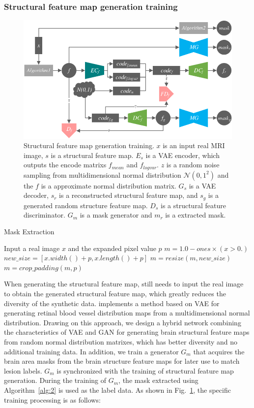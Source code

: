 \documentclass[runningheads]{llncs}
\begin{document}
\subsubsection{Structural feature map generation training}
\begin{figure}
	\centering
	\includegraphics[width=0.98\columnwidth]{figures/feature_train}
	\caption{Structural feature map generation training. $x$ is an input real MRI image, $s$ is a structural feature map. $E_s$ is a VAE encoder, which outputs the encode matrixs $f_{mean}$ and $f_{logvar}$. $z$ is a random noise sampling from multidimensional normal distribution $\mathcal{N}(0,1^2)$ and the $f$ is a approximate normal distribution matrix. $G_s$ is a VAE decoder, $s_r$ is a reconstructed structural feature map, and $s_g$ is a generated random structure feature map. $D_{s}$ is a structural feature discriminator. $G_m$ is a mask generator and $m_r$ is a extracted mask. }
	\label{feature_train}
\end{figure}
\begin{algorithm}
	\caption{Mask Extraction}
	\label{alg:2}
	\begin{algorithmic}[1]
		\State Input a real image $x$ and the expanded pixel value $p$
		\State $m = 1.0 - ones \times (x > 0.)$
		\State $new\_size=[x.width() + p, x.length() + p]$
		\State $m = resize(m, new\_size)$
		\State $m = crop\_padding(m,p)$
	\end{algorithmic}  
\end{algorithm}
When generating the structural feature map, \cite{4shin2018medical} still needs to input the real image to obtain the generated structural feature map, which greatly reduces the diversity of the synthetic data. \cite{41costa2017towards} implements a method based on VAE for generating retinal blood vessel distribution maps from a multidimensional normal distribution. Drawing on this approach, we design a hybrid network combining the characteristics of VAE and GAN for generating brain structural feature maps from random normal distribution matrixes, which has better diversity and no additional training data. In addition, we train a generator $G_m$ that acquires the brain area masks from the brain structure feature maps for later use to match lesion labels. $G_m$ is synchronized with the training of structural feature map generation. During the training of $G_m$, the mask extracted using Algorithm~\ref{alg:2} is used as the label data. As shown in Fig.~\ref{feature_train}, the specific training processing is as follows:
\end{document}
